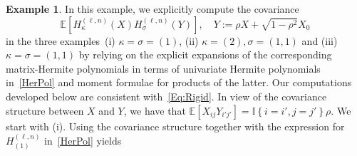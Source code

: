 \documentclass[10pt]{amsart}
\theoremstyle{definition}\newtheorem{defi}[theo]{Definition}\newtheorem{rema}[theo]{Remark}\newtheorem{exam}[theo]{Example}\newtheorem{exem}[theo]{Example}\newtheorem{nota}[theo]{Notation}
\newcommand{\E}[1]{\mathbb{E}\left[#1\right]}
\newcommand{\ind}[1]{\mathbb{I}
\left\{#1\right\}}
\begin{document}
\begin{exam}\label{Ex:Rigid}
In this example, we explicitly compute the covariance
\[
\E{H_{\kappa}^{(\ell,n)}(X)H_{\sigma}^{(\ell,n)}(Y)}, \quad Y:=\rho X+\sqrt{1-\rho^2}X_0
\]
in the three examples~(i) $\kappa=\sigma=(1)$, (ii) $\kappa=(2),\sigma=(1,1)$ and (iii) $\kappa=\sigma=(1,1)$ by relying on the explicit expansions of the corresponding matrix-Hermite polynomials in terms of univariate Hermite polynomials in~\eqref{HerPol} and moment formulae for products of the latter. Our computations developed below are consistent with~\eqref{Eq:Rigid}. In view of the covariance structure between $X$ and $Y$, we have that $\E{X_{ij}Y_{i'j'}} = \ind{i=i',j=j'} \rho$. We start with (i). Using the covariance structure together with the expression for $H_{(1)}^{(\ell,n)}$ in~\eqref{HerPol} yields


\end{exam}
\end{document}

